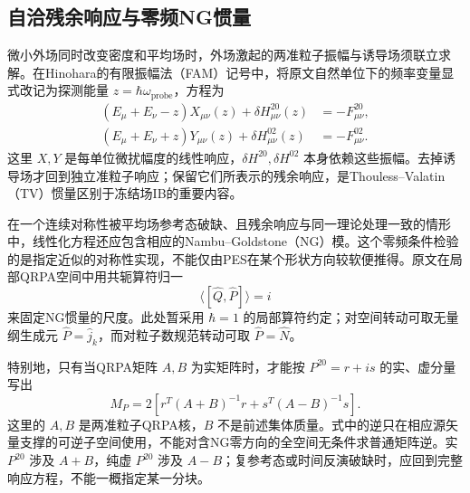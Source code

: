 \subsection{自洽残余响应与零频NG惯量}\label{sec:2-6-4}

微小外场同时改变密度和平均场时，外场激起的两准粒子振幅与诱导场须联立求解。在Hinohara的有限振幅法（FAM）记号中，将原文自然单位下的频率变量显式改记为探测能量 \(z=\hbar\omega_{\mathrm{probe}}\)，方程为
\begin{equation}\label{eq:2-6-fam-induced-field}
\begin{aligned}
(E_\mu+E_\nu-z)X_{\mu\nu}(z)
+\delta H^{20}_{\mu\nu}(z)&=-F^{20}_{\mu\nu},\\
(E_\mu+E_\nu+z)Y_{\mu\nu}(z)
+\delta H^{02}_{\mu\nu}(z)&=-F^{02}_{\mu\nu}.
\end{aligned}
\end{equation}
这里 \(X,Y\) 是每单位微扰幅度的线性响应，\(\delta H^{20},\delta H^{02}\) 本身依赖这些振幅。去掉诱导场才回到独立准粒子响应；保留它们所表示的残余响应，是Thouless--Valatin（TV）惯量区别于冻结场IB的重要内容。\cite[APS~PDF~p.~3, Eqs.~(32)--(33)]{hinohara-2015-nambu-goldstone-inertia-response}

在一个连续对称性被平均场参考态破缺、且残余响应与同一理论处理一致的情形中，线性化方程还应包含相应的Nambu--Goldstone（NG）模。这个零频条件检验的是指定近似的对称性实现，不能仅由PES在某个形状方向较软便推得。原文在局部QRPA空间中用共轭算符归一
\begin{equation}\label{eq:2-6-ng-normalization}
\langle[\hat Q,\hat P]\rangle=i
\end{equation}
来固定NG惯量的尺度。此处暂采用 \(\hbar=1\) 的局部算符约定；对空间转动可取无量纲生成元 \(\hat P=\hat j_k\)，而对粒子数规范转动可取 \(\hat P=\hat N\)。\cite[APS~PDF~p.~3, Eqs.~(15), (18)--(23)]{hinohara-2015-nambu-goldstone-inertia-response}

特别地，只有当QRPA矩阵 \(A,B\) 为实矩阵时，才能按 \(P^{20}=r+i s\) 的实、虚分量写出
\begin{equation}\label{eq:2-6-tv-real-imag}
M_P=2\left[
r^T(A+B)^{-1}r+s^T(A-B)^{-1}s
\right].
\end{equation}
这里的 \(A,B\) 是两准粒子QRPA核，\(B\) 不是前述集体质量。式中的逆只在相应源矢量支撑的可逆子空间使用，不能对含NG零方向的全空间无条件求普通矩阵逆。实 \(P^{20}\) 涉及 \(A+B\)，纯虚 \(P^{20}\) 涉及 \(A-B\)；复参考态或时间反演破缺时，应回到完整响应方程，不能一概指定某一分块。\cite[APS~PDF~p.~3, Eqs.~(20)--(23)]{hinohara-2015-nambu-goldstone-inertia-response}

